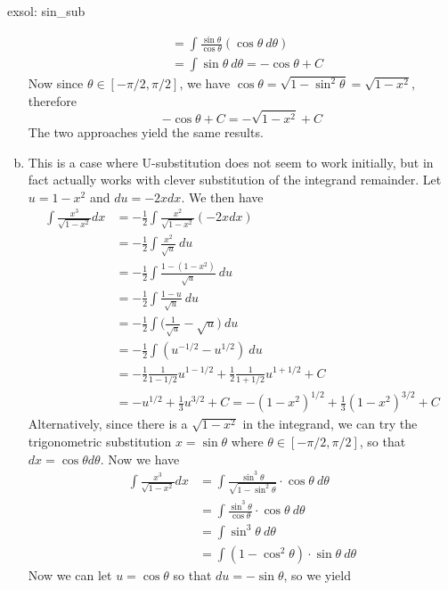\begin{exsol}[]{exsol: sin_sub}
\begin{enumerate}[a)]
\begin{align*}
            &= \int \frac{\sin \theta}{\cos \theta}(\cos \theta~d\theta)\\
            &= \int \sin \theta~d\theta = -\cos \theta + C
        \end{align*}
        Now since $\theta \in [-\pi/2, \pi/2]$, we have $\cos \theta = \sqrt{1-\sin^2\theta} = \sqrt{1-x^2}$, therefore
        \[-\cos \theta + C = -\sqrt{1-x^2} + C\]
        The two approaches yield the same results.
        \item This is a case where U-substitution does not seem to work initially, but in fact actually works with clever substitution of the integrand remainder.  Let $u = 1-x^2$ and $du = -2xdx$.  We then have
        \begin{align*}
            \int \frac{x^3}{\sqrt{1-x^2}} dx &= -\frac{1}{2}\int \frac{x^2}{\sqrt{1-x^2}} (-2xdx)\\
            &= -\frac{1}{2}\int \frac{x^2}{\sqrt{u}}~du\\
            &= -\frac{1}{2}\int \frac{1-(1-x^2)}{\sqrt{u}}~du\\
            &= -\frac{1}{2}\int \frac{1-u}{\sqrt{u}}~du\\
            &= -\frac{1}{2}\int \Big(\frac{1}{\sqrt{u}} - \sqrt{u}\Big)~du\\
            &= -\frac{1}{2}\int (u^{-1/2} - u^{1/2})~du\\
            &= -\frac{1}{2} \frac{1}{1-1/2} u^{1-1/2} + \frac{1}{2}\frac{1}{1+1/2}u^{1+1/2} + C\\
            &= -u^{1/2} + \frac{1}{3}u^{3/2} + C = -(1-x^2)^{1/2} + \frac{1}{3}(1-x^2)^{3/2} + C
        \end{align*}
        Alternatively, since there is a $\sqrt{1-x^2}$ in the integrand, we can try the trigonometric substitution $x = \sin \theta$ where $\theta \in [-\pi/2, \pi/2]$, so that $dx = \cos \theta d\theta$.  Now we have
        \begin{align*}
            \int \frac{x^3}{\sqrt{1-x^2}} dx &= \int \frac{\sin^3\theta}{\sqrt{1-\sin^2\theta}} \cdot \cos \theta~d\theta\\
            &=\int \frac{\sin^3\theta}{\cos \theta} \cdot \cos \theta~d\theta\\
            &=\int \sin^3\theta~d\theta\\
            &=\int (1-\cos^2\theta)\cdot \sin \theta~d\theta
        \end{align*}
        Now we can let $u = \cos \theta$ so that $du = -\sin \theta$, so we yield
        \begin{align*}

\end{align*}
\end{enumerate}
\end{exsol}

